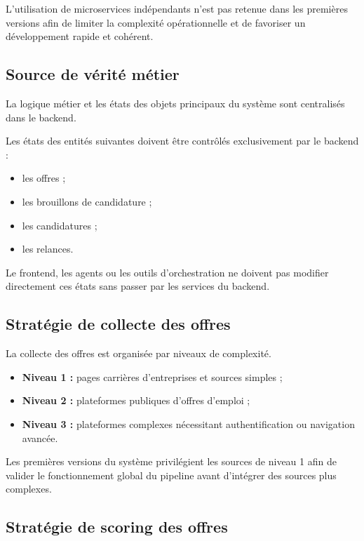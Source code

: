 \documentclass[11pt,a4paper]{article}
\begin{document}
L’utilisation de microservices indépendants n’est pas retenue dans les premières versions afin de limiter la complexité opérationnelle et de favoriser un développement rapide et cohérent.

\subsection{Source de vérité métier}

La logique métier et les états des objets principaux du système sont centralisés dans le backend.

Les états des entités suivantes doivent être contrôlés exclusivement par le backend :

\begin{itemize}
\item les offres ;
\item les brouillons de candidature ;
\item les candidatures ;
\item les relances.
\end{itemize}

Le frontend, les agents ou les outils d’orchestration ne doivent pas modifier directement ces états sans passer par les services du backend.

\subsection{Stratégie de collecte des offres}

La collecte des offres est organisée par niveaux de complexité.

\begin{itemize}
\item \textbf{Niveau 1 :} pages carrières d’entreprises et sources simples ;
\item \textbf{Niveau 2 :} plateformes publiques d’offres d’emploi ;
\item \textbf{Niveau 3 :} plateformes complexes nécessitant authentification ou navigation avancée.
\end{itemize}

Les premières versions du système privilégient les sources de niveau 1 afin de valider le fonctionnement global du pipeline avant d’intégrer des sources plus complexes.

\subsection{Stratégie de scoring des offres}
\end{document}
